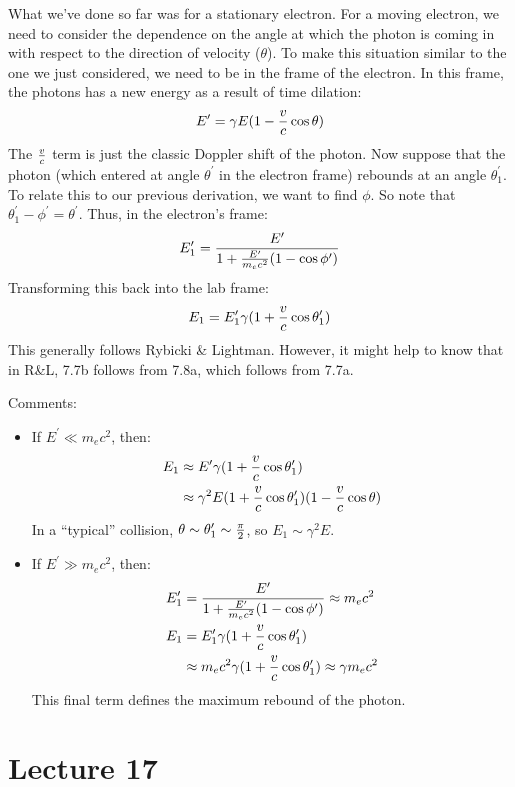 \documentclass[11pt]{article}
\begin{document}
What we've done so far was for a stationary electron.  For a moving electron,
we need to consider the dependence on the angle at which the photon
is coming in with respect to the direction of velocity ($\theta$).  To make
this situation similar to the one we just considered, we need to be in the
frame of the electron.  In this frame, the photons has a new energy as a
result of time dilation:
$$E^\prime=\gamma E(1-{v\over c}\cos\theta)$$
The $v\over c$ term is just the classic Doppler shift of the photon.  Now
suppose that the photon (which entered at angle $\theta^\prime$ in the 
electron frame) rebounds at an angle $\theta_1^\prime$.  To relate this to
our previous derivation, we want to find $\phi$.  So note that 
$\theta_1^\prime-\phi^\prime=\theta^\prime$.  Thus, in the electron's frame:
$$E_1^\prime={E^\prime\over1+{E^\prime\over m_ec^2}(1-\cos\phi^\prime)}$$
Transforming this back into the lab frame:
$$E_1=E_1^\prime\gamma(1+{v\over c}\cos\theta_1^\prime)$$
This generally follows Rybicki \& Lightman.  However, it might help to know
that in R\&L, 7.7b follows from 7.8a, which follows from 7.7a.\par
Comments:
\begin{itemize}
\item  If $E^\prime\ll m_ec^2$, then:
$$\begin{aligned}E_1&\approx E^\prime\gamma(1+{v\over c}\cos\theta_1^\prime)\\ 
&\approx\gamma^2E(1+{v\over c}\cos\theta_1^\prime)(1-{v\over c}\cos\theta)\\ \end{aligned}$$
In a ``typical'' collision, $\theta\sim\theta_1^\prime\sim{\pi\over2}$, so
$E_1\sim\gamma^2E$.
\item  If $E^\prime\gg m_ec^2$, then:
$$\begin{aligned}E_1^\prime&={E^\prime\over1+{E^\prime\over m_ec^2}
(1-\cos\phi^\prime)}\approx m_ec^2\\ 
E_1&=E_1^\prime\gamma(1+{v\over c}\cos\theta_1^\prime)\\ 
&\approx m_ec^2\gamma(1+{v\over c}\cos\theta_1^\prime)\approx\gamma m_ec^2\\ \end{aligned}$$
This final term defines the maximum rebound of the photon.
\end{itemize}

\section*{ Lecture 17 }
\end{document}
